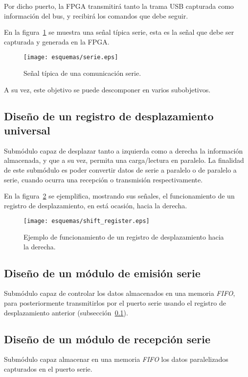 Por dicho puerto, la FPGA transmitirá tanto la trama USB capturada como información del bus, y recibirá los comandos que debe seguir.

En la figura~\ref{fig:serie_esquema} se muestra una señal típica serie, esta es la señal que debe ser capturada y generada en la FPGA.

\begin{figure}[htb]
    \centering
    \texttt{[image: esquemas/serie.eps]}
    \caption{Señal típica de una comunicación serie.}
    \label{fig:serie_esquema}
\end{figure}

A su vez, este objetivo se puede descomponer en varios subobjetivos.
\subsection{Diseño de un registro de desplazamiento universal}
\label{ssct:registro_desplazamiento}
Submódulo capaz de desplazar tanto a izquierda como a derecha la información almacenada, y que a su vez, permita una carga/lectura en paralelo.
La finalidad de este submódulo es poder convertir datos de serie a paralelo o de paralelo a serie, cuando ocurra una recepción o transmisión respectivamente.

En la figura~\ref{fig:shift_ejemplo} se ejemplifica, mostrando sus señales, el funcionamiento de un registro de desplazamiento, en está ocasión, hacia la derecha.

\begin{figure}[htb]
    \centering
    \texttt{[image: esquemas/shift\_register.eps]}
    \caption{Ejemplo de funcionamiento de un registro de desplazamiento hacia la derecha.}
    \label{fig:shift_ejemplo}
\end{figure}

\subsection{Diseño de un módulo de emisión serie}
Submódulo capaz de controlar los datos almacenados en una memoria \emph{FIFO}, para posteriormente transmitirlos por el puerto serie usando el registro de desplazamiento anterior (subsección~\ref{ssct:registro_desplazamiento}).

\subsection{Diseño de un módulo de recepción serie}
Submódulo capaz almacenar en una memoria \emph{FIFO} los datos paralelizados capturados en el puerto serie.



